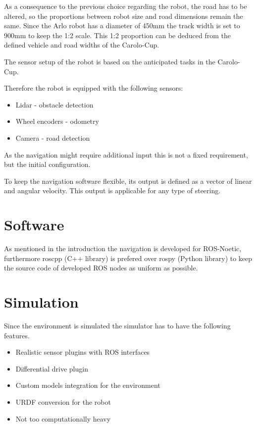 As a consequence to the previous choice regarding the robot, the road has to be altered, so the proportions between robot size and road dimensions remain the same. Since the Arlo robot has a diameter of 450mm the track width is set to 900mm to keep the 1:2 scale. This 1:2 proportion can be deduced from the defined vehicle and road widths of the Carolo-Cup\cite{carolocup}.

The sensor setup of the robot is based on the anticipated tasks in the Carolo-Cup. 

Therefore the robot is equipped with the following sensors:

\begin{itemize}
	\item Lidar - obstacle detection
	\item Wheel encoders - odometry
	\item Camera - road detection
\end{itemize}

As the navigation might require additional input this is not a fixed requirement, but the initial configuration.

To keep the navigation software flexible, its output is defined as a vector of linear and angular velocity. This output is applicable for any type of steering.

\section{Software}
As mentioned in the introduction the navigation is developed for ROS-Noetic, furthermore roscpp (C++ library) is prefered over rospy (Python library) to keep the source code of developed ROS nodes as uniform as possible.

\section{Simulation}
Since the environment is simulated the simulator has to have the following features.
\begin{itemize}
	\item Realistic sensor plugins with ROS interfaces
	\item Differential drive plugin
	\item Custom models integration for the environment
	\item URDF conversion for the robot
	\item Not too computationally heavy
\end{itemize}

